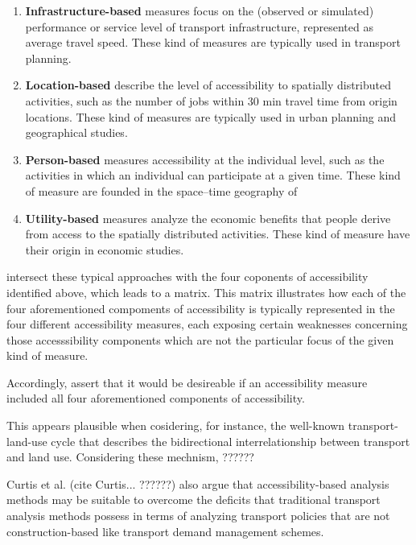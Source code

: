 \begin{enumerate}
	\item \textbf{Infrastructure-based} measures focus on the (observed or simulated) performance or service level of transport infrastructure, \eg represented as average travel speed. These kind of measures are typically used in transport planning.
	
	\item \textbf{Location-based} describe the level of accessibility to spatially distributed activities, such as the number of jobs within 30 min travel time from origin locations. These kind of measures are typically used in urban planning and geographical studies.
	
	\item \textbf{Person-based} measures accessibility at the individual level, such as the activities in which an individual can participate at a given time. These kind of measure are founded in the space–time geography of \citet{Haegerstrand1970}
	
	\item \textbf{Utility-based} measures analyze the economic benefits that people derive from access to the spatially distributed activities. These kind of measure have their origin in economic studies.
\end{enumerate}

\citet{Geurs2004AccessibilityReview} intersect these typical approaches with the four coponents of accessibility identified above, which leads to a matrix. This matrix illustrates how each of the four aforementioned compoments of accessibility is typically represented in the four different accessibility measures, each exposing certain weaknesses concerning those accesssibility components which are not the particular focus of the given kind of measure.

Accordingly, \citet{Geurs2004AccessibilityReview} assert that it would be desireable if an accessibility measure included all four aforementioned components of accessibility.

This appears plausible when cosidering, for instance, the well-known transport-land-use cycle that describes the bidirectional interrelationship between transport and land use. Considering these mechnism, ?????? 

Curtis et al. (cite Curtis... ??????) also argue that accessibility-based analysis methods may be suitable to overcome the deficits that traditional transport analysis methods possess in terms of analyzing transport policies that are not construction-based like transport demand management schemes.


